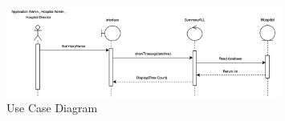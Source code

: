 \baselineskip=8mm
\renewcommand{\thesubsection}{\arabic{subsection}.}
\renewcommand{\theequation}{\thesection.\arabic{equation}}
\renewcommand{\thesection}{}
\renewcommand{\thesubsubsection}{\thesubsection\arabic{subsubsection}.}

\begin{figure}[t]
    \centering
    \includegraphics[width=0.8\textwidth]{Sequence 11.8.png}
    \caption{Use Case Diagram}
    \end{figure}
